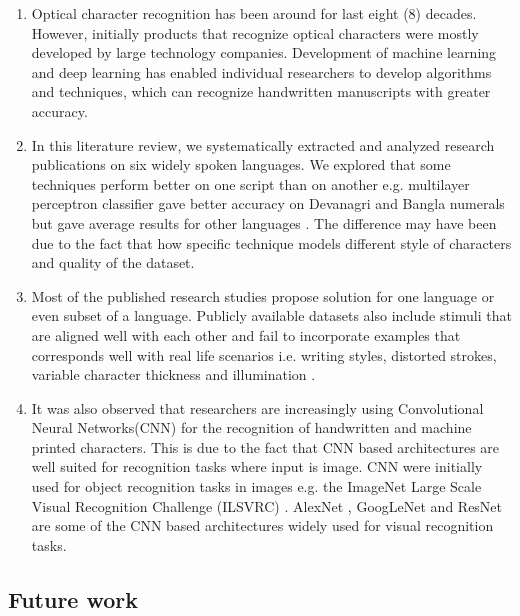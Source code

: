 \documentclass{article}
\begin{document}
\begin{enumerate}
\item Optical character recognition has been around for last eight (8) decades. However, initially products that recognize optical characters were mostly developed by large technology companies. Development of machine learning and deep learning has enabled individual researchers to develop algorithms and techniques, which can recognize handwritten manuscripts with greater accuracy. 

\item In this literature review, we systematically extracted and analyzed research publications on six widely spoken languages. We explored that some techniques perform better on one script than on another e.g. multilayer perceptron classifier gave better accuracy on Devanagri and Bangla numerals \cite{bhattacharya2009handwritten, mozaffari2004recognition} but gave average results for other languages \cite{ahlawat2017off, liu2002handwritten, sharma2013performance}. The difference may have been due to the fact that how specific technique models different style of characters and quality of the dataset. 

\item Most of the published research studies propose solution for one language or even subset of a language. Publicly available datasets also include stimuli that are aligned well with each other and fail to incorporate examples that corresponds well with real life scenarios i.e. writing styles, distorted strokes, variable character thickness and illumination \cite{long2018}. 

\item  It was also observed that researchers are increasingly using Convolutional Neural Networks(CNN) for the recognition of handwritten and machine printed characters. This is due to the fact that CNN based architectures are well suited for recognition tasks where input is image. CNN were initially used for object recognition tasks in images e.g. the ImageNet Large Scale Visual Recognition Challenge (ILSVRC) \cite{ILSVRC15}. AlexNet \cite{Krizhevsky1}, GoogLeNet \cite{7298594} and ResNet \cite{ResNet} are some of the CNN based architectures widely used for visual recognition tasks. 


\end{enumerate}




\subsection{Future work} \label{fworks}
\end{document}
